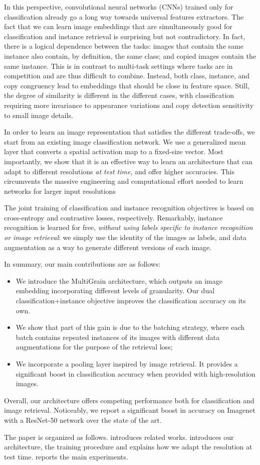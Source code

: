 In this perspective, convolutional neural networks (CNNs) trained only for classification already go a long way towards universal features extractors. %
%
%
The fact that we can learn image embeddings that are simultaneously good for classification and instance retrieval is surprising but not contradictory.
In fact, there is a logical dependence between the tasks: images that contain the same instance also contain, by definition, the same class; and copied images contain the same instance.
%
This is in contrast to multi-task settings where tasks are in competition and are thus difficult to combine.
Instead, both class, instance, and copy congruency lead to embeddings that should be close in feature space.
Still, the degree of similarity is different in the different cases, with classification requiring more invariance to appearance variations and copy detection sensitivity to small image details.

%
%
%
%
%
%

In order to learn an image representation that satisfies the different trade-offs, we start from an existing image classification network.
We use a generalized mean layer %
that converts a spatial activation map to a fixed-size vector.
%
%
Most importantly, we show that it is an effective way to learn an architecture that can adapt to different resolutions \emph{at test time}, and offer higher accuracies. This circumvents the massive engineering and computational effort needed to learn networks for larger input resolutions~\cite{He2016IdentityMI}

The joint training of classification and instance recognition objectives is based on cross-entropy and contrastive losses, respectively.
Remarkably, instance recognition is learned for free, \emph{without using labels specific to instance recognition or image retrieval}: we simply use the identity of the images as labels, and data augmentation as a way to generate different versions of each image. %
%

In summary, our main contributions are as follows: 
\begin{itemize}
    \item We introduce the MultiGrain architecture, which outputs an image embedding incorporating different levels of granularity. Our dual classification+instance objective improves the classification accuracy on its own. %
    \item We show that part of this gain is due to the batching strategy, where each batch contains repeated instances of its images with different data augmentations for the purpose of the retrieval loss; %
    \item We incorporate a pooling layer inspired by image retrieval. It provides a significant boost in classification accuracy when provided with high-resolution images.
\end{itemize}
Overall, our architecture offers competing performance both for classification and image retrieval. Noticeably, we report a significant boost in accuracy on Imagenet with a ResNet-50 network over the state of the art. 


%

The paper is organized as follows.  introduces related works.  introduces our architecture, the training procedure and explains how we adapt the resolution at test time.  reports the main experiments. %
